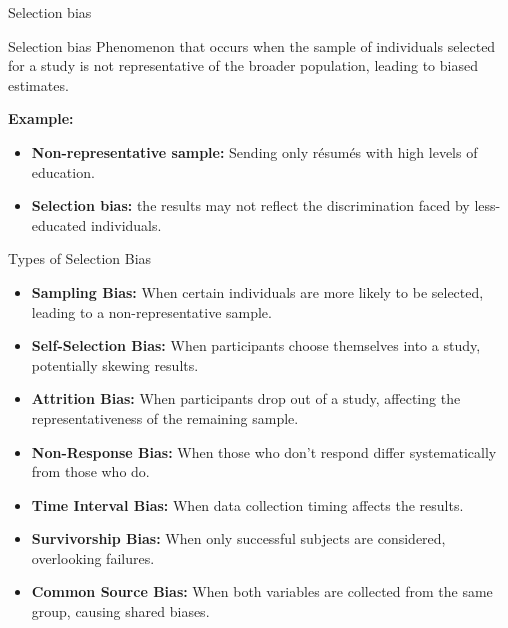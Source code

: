 \documentclass[aspectratio=169]{beamer}
\begin{document}
\begin{frame}{Selection bias}
    
    \begin{coolblock}{Selection bias}
       Phenomenon that occurs when the sample of individuals selected for a study is not representative of the broader population, leading to biased estimates.
    \end{coolblock}

    \textbf{Example:} 
    \begin{itemize}
        \item \textbf{Non-representative sample:} Sending only résumés with high levels of education. 
        \item \textbf{Selection bias:} the results may not reflect the discrimination faced by less-educated individuals. 
    \end{itemize}


\end{frame}

\begin{frame}{Types of Selection Bias}

\begin{itemize}
    \item \textbf{Sampling Bias:} When certain individuals are more likely to be selected, leading to a non-representative sample.
    \item \textbf{Self-Selection Bias:} When participants choose themselves into a study, potentially skewing results.
    \item \textbf{Attrition Bias:} When participants drop out of a study, affecting the representativeness of the remaining sample.
    \item \textbf{Non-Response Bias:} When those who don't respond differ systematically from those who do.
    \item \textbf{Time Interval Bias:} When data collection timing affects the results.
    \item \textbf{Survivorship Bias:} When only successful subjects are considered, overlooking failures.
    \item \textbf{Common Source Bias:} When both variables are collected from the same group, causing shared biases.
\end{itemize}
    
\end{frame}
\end{document}
